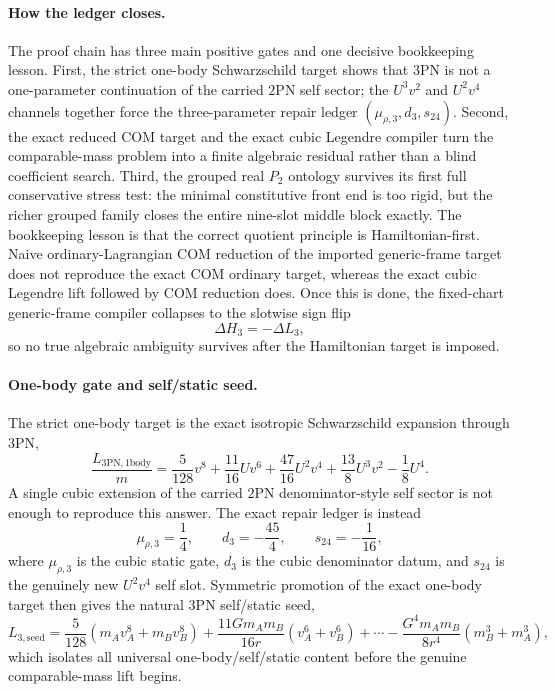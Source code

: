 \documentclass[11pt]{article}
\begin{document}
\paragraph{How the ledger closes.}
The proof chain has three main positive gates and one decisive bookkeeping
lesson.  First, the strict one-body Schwarzschild target shows that $3$PN is not
a one-parameter continuation of the carried $2$PN self sector; the $U^3v^2$ and
$U^2v^4$ channels together force the three-parameter repair ledger
\((\mu_{\rho,3},d_3,s_{24})\).  Second, the exact reduced COM target and the
exact cubic Legendre compiler turn the comparable-mass problem into a finite
algebraic residual rather than a blind coefficient search.  Third, the grouped
real $P_2$ ontology survives its first full conservative stress test: the minimal
constitutive front end is too rigid, but the richer grouped family closes the
entire nine-slot middle block exactly.  The bookkeeping lesson is that the
correct quotient principle is Hamiltonian-first.  Naive ordinary-Lagrangian COM
reduction of the imported generic-frame target does not reproduce the exact COM
ordinary target, whereas the exact cubic Legendre lift followed by COM reduction
does.  Once this is done, the fixed-chart generic-frame compiler collapses to the
slotwise sign flip
\[
\Delta H_3=-\Delta L_3,
\]
so no true algebraic ambiguity survives after the Hamiltonian target is imposed.

\paragraph{One-body gate and self/static seed.}
The strict one-body target is the exact isotropic Schwarzschild expansion through
$3$PN,
\[
\frac{L_{3\mathrm{PN},1\mathrm{body}}}{m}
=
\frac5{128}v^8
+\frac{11}{16}Uv^6
+\frac{47}{16}U^2v^4
+\frac{13}{8}U^3v^2
-\frac18U^4.
\]
A single cubic extension of the carried $2$PN denominator-style self sector is
not enough to reproduce this answer.  The exact repair ledger is instead
\[
\mu_{\rho,3}=\frac14,
\qquad
 d_3=-\frac{45}{4},
\qquad
 s_{24}=-\frac1{16},
\]
where $\mu_{\rho,3}$ is the cubic static gate, $d_3$ is the cubic denominator
datum, and $s_{24}$ is the genuinely new $U^2v^4$ self slot.  Symmetric
promotion of the exact one-body target then gives the natural $3$PN self/static
seed,
\[
L_{3,\mathrm{seed}}
=
\frac{5}{128}(m_Av_A^8+m_Bv_B^8)
+\frac{11Gm_A m_B}{16r}(v_A^6+v_B^6)
+\cdots
-\frac{G^4m_A m_B}{8r^4}(m_B^3+m_A^3),
\]
which isolates all universal one-body/self/static content before the genuine
comparable-mass lift begins.
\end{document}
